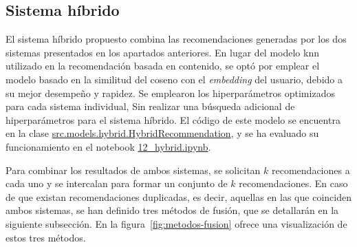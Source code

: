 \subsection{Sistema híbrido}
\label{subsec:implementacion-hybrid}


El sistema híbrido propuesto combina las recomendaciones generadas por los dos sistemas presentados en los apartados anteriores. En lugar del modelo \gls{knn} utilizado en la recomendación basada en contenido, se optó por emplear el modelo basado en la similitud del coseno con el \textit{embedding} del usuario, debido a su mejor desempeño y rapidez. Se emplearon los hiperparámetros optimizados para cada sistema individual, Sin realizar una búsqueda adicional de hiperparámetros para el sistema híbrido. El código de este modelo se encuentra en la clase \url{src.models.hybrid.HybridRecommendation}, y se ha evaluado su funcionamiento en el notebook \url{12_hybrid.ipynb}.

Para combinar los resultados de ambos sistemas, se solicitan $k$ recomendaciones a cada uno y se intercalan para formar un conjunto de $k$ recomendaciones. En caso de que existan recomendaciones duplicadas, es decir, aquellas en las que coinciden ambos sistemas, se han definido tres métodos de fusión, que se detallarán en la siguiente subsección. En la figura~\ref{fig:metodos-fusion} ofrece una visualización de estos tres métodos.

